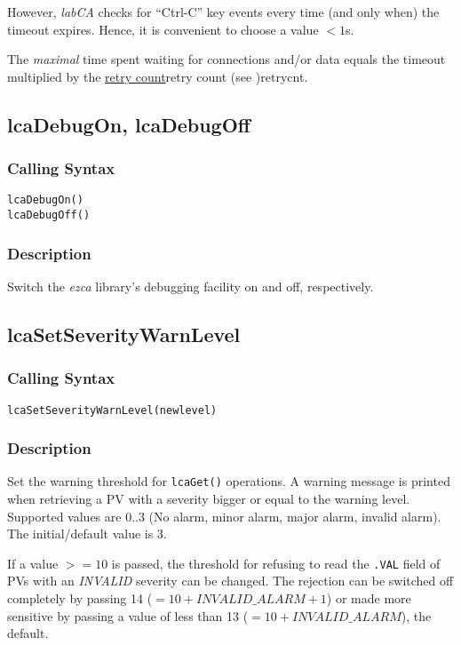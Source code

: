 \documentclass{article}
\newcommand{\sca}{\ita{labCA}}
\newcommand{\ezca}{\ita{ezca}}
\newcommand{\com}[1]{{\tt #1}}
\newcommand{\pbrk}{\pagebreak[3]}
\newcommand{\ita}[1]{\emph{#1}}
\newcommand{\sevrange}{$0..3$}
\renewcommand{\sevrange}{0..3}
\renewcommand{\pbrk}{}
\begin{document}
However, \sca{} checks for ``Ctrl-C'' key events every time
(and only when) the timeout expires. Hence, it is convenient to
choose a value $<1$s.

The {\em maximal} time spent waiting for connections and/or data equals the
timeout multiplied by the
\hyperref[ref]{retry count}{retry count (see }{ )}{retrycnt}.

\vspace*{\fill}
\pbrk
\subsection{lcaDebugOn, lcaDebugOff}
\subsubsection{Calling Syntax}
\begin{verbatim}
lcaDebugOn()
lcaDebugOff()
\end{verbatim}
\subsubsection{Description}
Switch the \ezca{} library's debugging facility on and off, respectively.

\vspace*{\fill}
\pbrk
\subsection{lcaSetSeverityWarnLevel}
\label{swarnlevel}
\subsubsection{Calling Syntax}
\begin{verbatim}
lcaSetSeverityWarnLevel(newlevel)
\end{verbatim}
\subsubsection{Description}
Set the warning threshold for \com{lcaGet()} operations.
A warning message is printed when retrieving a PV with a severity bigger
or equal to the warning level. Supported values are \sevrange{} (No alarm,
minor alarm, major alarm, invalid alarm). The initial/default value is 3.

If a value $>=10$ is passed, the threshold for refusing to read the \com{.VAL}
field of PVs with an \ita{INVALID} severity can be changed. The rejection
can be switched off completely by passing 14 ($= 10 + INVALID\_ALARM + 1$)
or made more sensitive by passing a value of less than 13 ($=10 + INVALID\_ALARM$),
the default.
\end{document}
